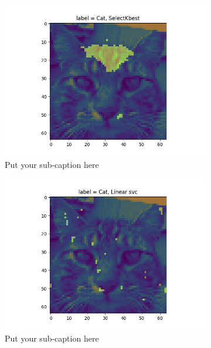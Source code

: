 \documentclass{article}
\begin{document}
\begin{figure}[ht]
\begin{subfigure}{.33\textwidth}
  \centering
  \includegraphics[width=1\linewidth]{1b/Imp_feat_kbest.png}  
  \caption{Put your sub-caption here}
  \label{fig:sub-first}
\end{subfigure}
\begin{subfigure}{.33\textwidth}
  \centering
  \includegraphics[width=1\linewidth]{1b/Imp_feat_svc.png}  
  \caption{Put your sub-caption here}
  \label{fig:sub-second}
\end{subfigure}
\begin{subfigure}{.33\textwidth}
  \centering

\end{subfigure}
\end{figure}
\end{document}
